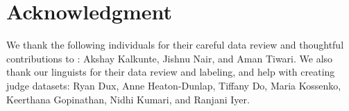 \section*{Acknowledgment}
We thank the following individuals for their careful data review and thoughtful contributions to \framework: Akshay Kalkunte, Jishnu Nair, and Aman Tiwari. We also thank our linguists for their data review and labeling, and help with creating judge datasets: Ryan Dux, Anne Heaton-Dunlap, Tiffany Do, Maria Kossenko, Keerthana Gopinathan, Nidhi Kumari, and Ranjani Iyer.
